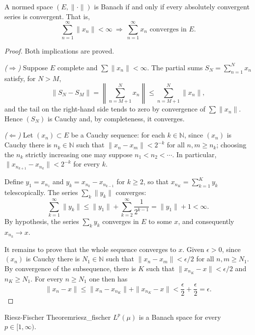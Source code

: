 \documentclass[11pt, a4paper]{article}
\begin{document}
\begin{lema}
\label{lema:completitud_normados}
A normed space $(E, \|\cdot\|)$ is Banach if and only if every absolutely convergent series
is convergent. That is,
$$ \sum_{n=1}^{\infty} \|x_n\| < \infty \ \Longrightarrow\ \sum_{n=1}^{\infty} x_n
\text{ converges in } E. $$
\end{lema}

\begin{proof}
Both implications are proved.

\textit{($\Rightarrow$)} Suppose $E$ complete and $\sum \|x_n\| < \infty$. The partial sums
$S_N = \sum_{n=1}^N x_n$ satisfy, for $N > M$,
$$ \|S_N - S_M\| = \left\| \sum_{n=M+1}^N x_n \right\| \le \sum_{n=M+1}^N \|x_n\|, $$
and the tail on the right-hand side tends to zero by convergence of $\sum \|x_n\|$. Hence $(S_N)$ is
Cauchy and, by completeness, it converges.

\textit{($\Leftarrow$)} Let $(x_n) \subset E$ be a Cauchy sequence: for each $k \in \mathbb{N}$, since
$(x_n)$ is Cauchy there is $n_k \in \mathbb{N}$ such that $\|x_n - x_m\| < 2^{-k}$ for all $n, m \ge n_k$; 
choosing the $n_k$ strictly increasing one may suppose $n_1 < n_2 < \cdots$. In particular,
$\|x_{n_{k+1}} - x_{n_k}\| < 2^{-k}$ for every $k$.

Define $y_1 = x_{n_1}$ and $y_k = x_{n_k} - x_{n_{k-1}}$ for $k \ge 2$, so that
$x_{n_K} = \sum_{k=1}^K y_k$ telescopically. The series $\sum_k \|y_k\|$ converges:
$$ \sum_{k=1}^\infty \|y_k\| \le \|y_1\| + \sum_{k=2}^\infty \frac{1}{2^{k-1}} = \|y_1\| + 1
< \infty. $$
By hypothesis, the series $\sum_k y_k$ converges in $E$ to some $x$, and consequently
$x_{n_k} \to x$.

It remains to prove that the whole sequence converges to $x$. Given $\epsilon > 0$, since $(x_n)$ is
Cauchy there is $N_1 \in \mathbb{N}$ such that $\|x_n - x_m\| < \epsilon/2$ for all $n, m \ge N_1$.
By convergence of the subsequence, there is $K$ such that $\|x_{n_K} - x\| < \epsilon/2$ and
$n_K \ge N_1$. For every $n \ge N_1$ one then has
$$ \|x_n - x\| \le \|x_n - x_{n_K}\| + \|x_{n_K} - x\| < \frac{\epsilon}{2} + \frac{\epsilon}{2}
= \epsilon. $$
\end{proof}

\begin{teorema}{Riesz-Fischer Theorem}{riesz_fischer}
$L^p(\mu)$ is a Banach space for every $p \in [1, \infty)$.
\end{teorema}
\end{document}
